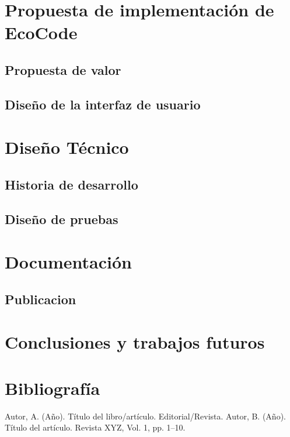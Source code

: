 \documentclass[12pt,a4paper]{report}
\begin{document}
\chapter{Propuesta de implementación de EcoCode}

\section{Propuesta de valor}

\section{Diseño de la interfaz de usuario}

\chapter{Diseño Técnico}

\section{Historia de desarrollo}

\section{Diseño de pruebas}

\chapter{Documentación}

\section{Publicacion}

\chapter{Conclusiones y trabajos futuros}

\chapter*{Bibliografía}
\begin{thebibliography}{99}
     Autor, A. (Año). Título del libro/artículo. Editorial/Revista.
     Autor, B. (Año). Título del artículo. Revista XYZ, Vol. 1, pp. 1--10.
\end{thebibliography}
\end{document}
